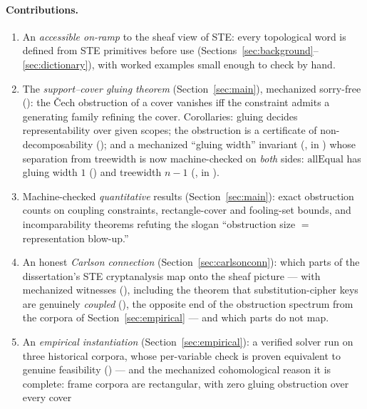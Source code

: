 \documentclass[11pt]{article}
\begin{document}
\paragraph{Contributions.}
\begin{enumerate}
\item An \emph{accessible on-ramp} to the sheaf view of STE: every
  topological word is defined from STE primitives before use
  (Sections~\ref{sec:background}--\ref{sec:dictionary}), with worked
  examples small enough to check by hand.
\item The \emph{support--cover gluing theorem}
  (Section~\ref{sec:main}), mechanized sorry-free
  (): the \v{C}ech obstruction of a cover
  vanishes iff the constraint admits a generating family refining the
  cover.  Corollaries: gluing decides representability over given
  scopes; the obstruction is a certificate of non-decomposability
  (); and a
  mechanized ``gluing width'' invariant (, in
  ) whose separation from treewidth is now
  machine-checked on \emph{both} sides: $\mathrm{allEqual}$ has
  gluing width $1$ () and treewidth
  $n-1$ (, in
  ).
\item Machine-checked \emph{quantitative} results
  (Section~\ref{sec:main}): exact obstruction counts on coupling
  constraints, rectangle-cover and fooling-set bounds, and
  incomparability theorems refuting the slogan ``obstruction size $=$
  representation blow-up.''
\item An honest \emph{Carlson connection}
  (Section~\ref{sec:carlsonconn}): which parts of the dissertation's
  STE cryptanalysis \citep{carlson2012} map onto the sheaf picture
  --- with mechanized witnesses (),
  including the theorem that substitution-cipher keys are genuinely
  \emph{coupled} (), the opposite end
  of the obstruction spectrum from the corpora of
  Section~\ref{sec:empirical} --- and which parts do not map.
\item An \emph{empirical instantiation} (Section~\ref{sec:empirical}):
  a verified solver run on three historical corpora, whose
  per-variable check is proven equivalent to genuine feasibility
  () --- and
  the mechanized cohomological reason it is complete: frame corpora
  are rectangular, with zero gluing obstruction over every cover

\end{enumerate}
\end{document}
